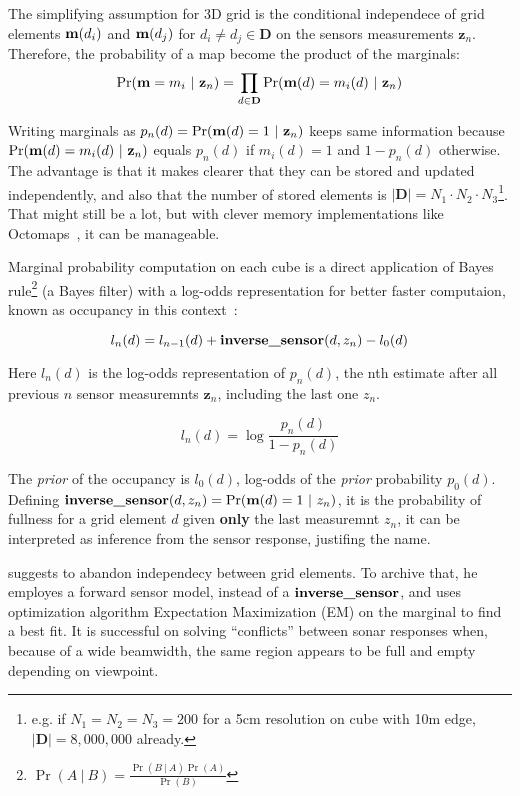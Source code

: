 The simplifying assumption for 3D grid is the conditional
independece of grid
elements $\mathrm{\mathbf{m}}(d_i)$ and $\mathrm{\mathbf{m}}(d_j)$ for $d_i\neq d_j \in \mathbf{D}$
on the sensors measurements $\mathbf{z}_n$.
Therefore, the probability of a map become the product of the marginals:
\begin{equation*}
\Pr(\mathrm{\mathbf{m}}=m_i~|~\mathbf{z}_n)=\prod_{d\in\mathbf{D}}\Pr(\mathrm{\mathbf{m}}(d)=m_i(d)~|~\mathbf{z}_n)
\end{equation*}

Writing marginals as $p_n(d) = \Pr(\mathrm{\mathbf{m}}(d)=1~|~\mathbf{z}_n)$ keeps same
information because $\Pr(\mathrm{\mathbf{m}}(d)=m_i(d)~|~\mathbf{z}_n)$ equals $p_n(d)$ if
$m_i(d)=1$ and $1-p_n(d)$ otherwise. The advantage is that it makes clearer that
they can be stored and updated independently, and also that the number of stored
elements is $|\mathbf{D}|=N_1\cdot N_2\cdot N_3$\footnote{e.g. if
$N_1=N_2=N_3=200$ for a 5cm resolution on cube with 10m edge,
$|\mathbf{D}|=8,000,000$ already.}.
That might still be a lot, but with clever memory implementations like
Octomaps~\cite{hornung2013octomap}, it can be manageable.

Marginal probability computation on each cube is a direct application of Bayes
rule\footnote{$\Pr(A~|~B)=\frac{\Pr(B~|~A)\Pr(A)}{\Pr(B)}$} (a Bayes filter)
with a log-odds representation for better faster
computaion, known as occupancy in this context~\cite{thrunprob}:

\begin{equation}
\label{eq:gridoccupancy}
l_n(d) = l_{n-1}(d)+ \text{\textbf{inverse\_sensor}}(d,z_n) - l_0(d)
\end{equation}

Here $l_n(d)$ is the log-odds representation of $p_n(d)$, the nth estimate after
all previous $n$ sensor measuremnts $\mathbf{z}_n$, including the last one
$z_n$.

\begin{equation*}
l_n(d) = \log\frac{p_n(d)}{1-p_n(d)} 
\end{equation*}

The \textit{prior} of the occupancy is $l_0(d)$, log-odds of the \textit{prior}
probability $p_0(d)$. Defining
$\text{\textbf{inverse\_sensor}}(d,z_n)=\Pr(\mathrm{\mathbf{m}}(d)=1~|~z_n)$, it is the
probability of fullness for a grid element $d$ given \textbf{only} the last
measuremnt $z_n$, it can be interpreted as inference from the sensor response,
justifing the name.

\citet{thrunprob} suggests to abandon independecy between grid elements. To
archive that, he employes a forward sensor model, instead of a
$\text{\textbf{inverse\_sensor}}$, and uses optimization algorithm Expectation
Maximization (EM) on the marginal to find a best fit. It is successful on
solving ``conflicts'' between sonar responses when, because of a wide beamwidth,
the same region appears to be full and empty depending on viewpoint.

